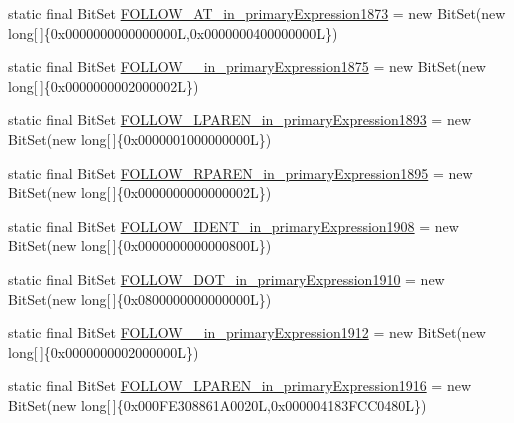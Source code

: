 \begin{DoxyCompactItemize}
\item 
static final Bit\-Set \hyperlink{classorg_1_1tzi_1_1use_1_1parser_1_1testsuite_1_1_test_suite_parser_a36e1081b83f1e429d44d93f4ee0adb45}{F\-O\-L\-L\-O\-W\-\_\-\-A\-T\-\_\-in\-\_\-primary\-Expression1873} = new Bit\-Set(new long\mbox{[}$\,$\mbox{]}\{0x0000000000000000\-L,0x0000000400000000\-L\})
\item 
static final Bit\-Set \hyperlink{classorg_1_1tzi_1_1use_1_1parser_1_1testsuite_1_1_test_suite_parser_af2cf4acdf82ee2d6fae0d9642bdfb81a}{F\-O\-L\-L\-O\-W\-\_\-\_\-in\-\_\-primary\-Expression1875} = new Bit\-Set(new long\mbox{[}$\,$\mbox{]}\{0x0000000002000002\-L\})
\item 
static final Bit\-Set \hyperlink{classorg_1_1tzi_1_1use_1_1parser_1_1testsuite_1_1_test_suite_parser_af764bba202955ad387755e58845cf7c2}{F\-O\-L\-L\-O\-W\-\_\-\-L\-P\-A\-R\-E\-N\-\_\-in\-\_\-primary\-Expression1893} = new Bit\-Set(new long\mbox{[}$\,$\mbox{]}\{0x0000001000000000\-L\})
\item 
static final Bit\-Set \hyperlink{classorg_1_1tzi_1_1use_1_1parser_1_1testsuite_1_1_test_suite_parser_a029d204705aa485b6a53147295203b94}{F\-O\-L\-L\-O\-W\-\_\-\-R\-P\-A\-R\-E\-N\-\_\-in\-\_\-primary\-Expression1895} = new Bit\-Set(new long\mbox{[}$\,$\mbox{]}\{0x0000000000000002\-L\})
\item 
static final Bit\-Set \hyperlink{classorg_1_1tzi_1_1use_1_1parser_1_1testsuite_1_1_test_suite_parser_afa2ffa1e3515d2fa55ae61225e507395}{F\-O\-L\-L\-O\-W\-\_\-\-I\-D\-E\-N\-T\-\_\-in\-\_\-primary\-Expression1908} = new Bit\-Set(new long\mbox{[}$\,$\mbox{]}\{0x0000000000000800\-L\})
\item 
static final Bit\-Set \hyperlink{classorg_1_1tzi_1_1use_1_1parser_1_1testsuite_1_1_test_suite_parser_a54b1dd55a09f4cf111e4b4b5fe92db71}{F\-O\-L\-L\-O\-W\-\_\-\-D\-O\-T\-\_\-in\-\_\-primary\-Expression1910} = new Bit\-Set(new long\mbox{[}$\,$\mbox{]}\{0x0800000000000000\-L\})
\item 
static final Bit\-Set \hyperlink{classorg_1_1tzi_1_1use_1_1parser_1_1testsuite_1_1_test_suite_parser_a019fe7e13047cfc1479e265e1881bc4c}{F\-O\-L\-L\-O\-W\-\_\-\_\-in\-\_\-primary\-Expression1912} = new Bit\-Set(new long\mbox{[}$\,$\mbox{]}\{0x0000000002000000\-L\})
\item 
static final Bit\-Set \hyperlink{classorg_1_1tzi_1_1use_1_1parser_1_1testsuite_1_1_test_suite_parser_a79d2310d7dfdf42679e0b1468317bbc9}{F\-O\-L\-L\-O\-W\-\_\-\-L\-P\-A\-R\-E\-N\-\_\-in\-\_\-primary\-Expression1916} = new Bit\-Set(new long\mbox{[}$\,$\mbox{]}\{0x000\-F\-E308861\-A0020\-L,0x000004183\-F\-C\-C0480\-L\})

\end{DoxyCompactItemize}
